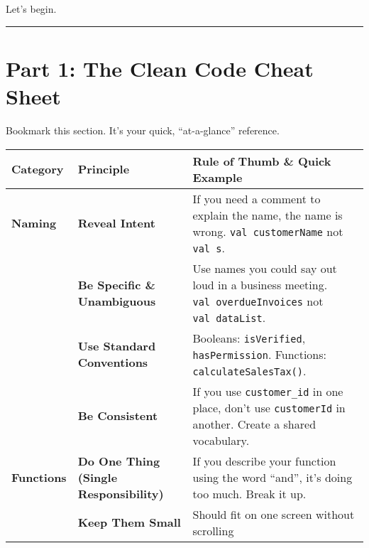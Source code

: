 \documentclass[
  letterpaper,
  DIV=11,
  numbers=noendperiod]{scrreprt}
\begin{document}
Let's begin.

\begin{center}\rule{0.5\linewidth}{0.5pt}\end{center}

\section{\texorpdfstring{\textbf{Part 1: The Clean Code Cheat
Sheet}}{Part 1: The Clean Code Cheat Sheet}}\label{part-1-the-clean-code-cheat-sheet}

Bookmark this section. It's your quick, ``at-a-glance'' reference.

\begin{longtable}[]{@{}
  >{\raggedright\arraybackslash}p{}
  >{\raggedright\arraybackslash}p{}
  >{\raggedright\arraybackslash}p{}@{}}
\toprule\noalign{}
\begin{minipage}[b]{\linewidth}\raggedright
Category
\end{minipage} & \begin{minipage}[b]{\linewidth}\raggedright
Principle
\end{minipage} & \begin{minipage}[b]{\linewidth}\raggedright
Rule of Thumb \& Quick Example
\end{minipage} \\
\midrule\noalign{}
\endhead
\bottomrule\noalign{}
\endlastfoot
\textbf{Naming} & \textbf{Reveal Intent} & If you need a comment to
explain the name, the name is wrong. \texttt{val\ customerName} not
\texttt{val\ s}. \\
& \textbf{Be Specific \& Unambiguous} & Use names you could say out loud
in a business meeting. \texttt{val\ overdueInvoices} not
\texttt{val\ dataList}. \\
& \textbf{Use Standard Conventions} & Booleans: \texttt{isVerified},
\texttt{hasPermission}. Functions: \texttt{calculateSalesTax()}. \\
& \textbf{Be Consistent} & If you use \texttt{customer\_id} in one
place, don't use \texttt{customerId} in another. Create a shared
vocabulary. \\
\textbf{Functions} & \textbf{Do One Thing (Single Responsibility)} & If
you describe your function using the word ``and'', it's doing too much.
Break it up. \\
& \textbf{Keep Them Small} & Should fit on one screen without scrolling

\end{longtable}
\end{document}
